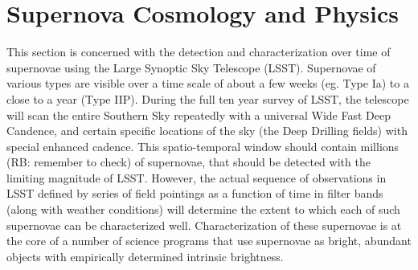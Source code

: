 %
%
%
%
%
%
%

\section{Supernova Cosmology and Physics}
\def\secname{supernovae}\label{sec:\secname}



This section is concerned with the detection and characterization over time of
supernovae using the Large Synoptic Sky Telescope (LSST). Supernovae of various
types are visible over a time scale of about a few weeks (eg. Type Ia) to a
 close to a year (Type IIP). During the full ten year survey of LSST, the
telescope will scan the entire Southern Sky repeatedly with a universal Wide Fast Deep
 Candence, and certain specific locations of the sky (the Deep Drilling fields)
with special enhanced cadence. This spatio-temporal window should contain
millions (RB: remember to check) of supernovae, that should be detected with the
 limiting magnitude of LSST. However, the actual sequence of observations in LSST
defined by series of field pointings as a function of time in filter bands
 (along with weather conditions) will determine the extent to which each of such
supernovae can be characterized well. Characterization of these supernovae is at
 the core of a number of science programs that use supernovae as bright, abundant
 objects with empirically determined intrinsic brightness.


